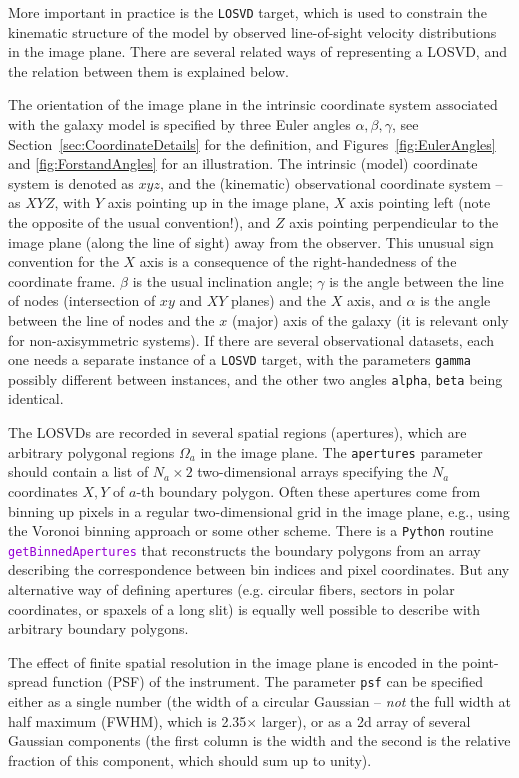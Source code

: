 \documentclass[12pt]{article}
\newcommand{\Python}{\texttt{Python}\xspace}
\newcommand{\ttt}[1]{\textcolor{darkviolet}{\texttt{#1}}}
\newcommand{\ppp}[1]{\textcolor{darkolive} {\texttt{#1}}}
\begin{document}
More important in practice is the \ppp{LOSVD} target, which is used to constrain the kinematic structure of the model by observed line-of-sight velocity distributions in the image plane. There are several related ways of representing a LOSVD, and the relation between them is explained below.

The orientation of the image plane in the intrinsic coordinate system associated with the galaxy model is specified by three Euler angles $\alpha,\beta,\gamma$, see Section~\ref{sec:CoordinateDetails} for the definition, and Figures~\ref{fig:EulerAngles} and \ref{fig:ForstandAngles} for an illustration. The intrinsic (model) coordinate system is denoted as $xyz$, and the (kinematic) observational coordinate system -- as $XYZ$, with $Y$ axis pointing up in the image plane, $X$ axis pointing left (note the opposite of the usual convention!), and $Z$ axis pointing perpendicular to the image plane (along the line of sight) away from the observer. This unusual sign convention for the $X$ axis is a consequence of the right-handedness of the coordinate frame. $\beta$ is the usual inclination angle; $\gamma$ is the angle between the line of nodes (intersection of $xy$ and $XY$ planes) and the $X$ axis, and $\alpha$ is the angle between the line of nodes and the $x$ (major) axis of the galaxy (it is relevant only for non-axisymmetric systems). If there are several observational datasets, each one needs a separate instance of a \ppp{LOSVD} target, with the parameters \ppp{gamma} possibly different between instances, and the other two angles \ppp{alpha}, \ppp{beta} being identical.

The LOSVDs are recorded in several spatial regions (apertures), which are arbitrary polygonal regions $\Omega_a$ in the image plane. The \ppp{apertures} parameter should contain a list of $N_a\times2$ two-dimensional arrays specifying the $N_a$ coordinates $X,Y$ of $a$-th boundary polygon. Often these apertures come from binning up pixels in a regular two-dimensional grid in the image plane, e.g., using the Voronoi binning approach \cite{CappellariCopin2003} or some other scheme. There is a \Python routine \ttt{getBinnedApertures} that reconstructs the boundary polygons from an array describing the correspondence between bin indices and pixel coordinates. But any alternative way of defining apertures (e.g. circular fibers, sectors in polar coordinates, or spaxels of a long slit) is equally well possible to describe with arbitrary boundary polygons.

The effect of finite spatial resolution in the image plane is encoded in the point-spread function (PSF) of the instrument. The parameter \ppp{psf} can be specified either as a single number (the width of a circular Gaussian -- \textit{not} the full width at half maximum (FWHM), which is 2.35$\times$ larger), or as a 2d array of several Gaussian components (the first column is the width and the second is the relative fraction of this component, which should sum up to unity).
\end{document}
